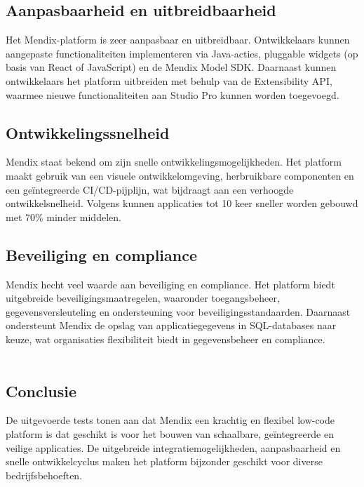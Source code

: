 \subsection{Aanpasbaarheid en uitbreidbaarheid}
Het Mendix-platform is zeer aanpasbaar en uitbreidbaar. Ontwikkelaars kunnen aangepaste functionaliteiten implementeren via Java-acties, pluggable widgets (op basis van React of JavaScript) en de Mendix Model SDK. Daarnaast kunnen ontwikkelaars het platform uitbreiden met behulp van de Extensibility \gls{API}, waarmee nieuwe functionaliteiten aan Studio Pro kunnen worden toegevoegd.

\subsection{Ontwikkelingssnelheid}
Mendix staat bekend om zijn snelle ontwikkelingsmogelijkheden. Het platform maakt gebruik van een visuele ontwikkelomgeving, herbruikbare componenten en een geïntegreerde CI/CD-pijplijn, wat bijdraagt aan een verhoogde ontwikkelsnelheid. Volgens \textcite{MxTechies} kunnen applicaties tot 10 keer sneller worden gebouwd met 70\% minder middelen. 

\subsection{Beveiliging en compliance}
Mendix hecht veel waarde aan beveiliging en compliance. Het platform biedt uitgebreide beveiligingsmaatregelen, waaronder toegangsbeheer, gegevensversleuteling en ondersteuning voor beveiligingsstandaarden. Daarnaast ondersteunt Mendix de opslag van applicatiegegevens in SQL-databases naar keuze, wat organisaties flexibiliteit biedt in gegevensbeheer en compliance. 
\\
\\
\subsection{Conclusie}
De uitgevoerde tests tonen aan dat Mendix een krachtig en flexibel low-code platform is dat geschikt is voor het bouwen van schaalbare, geïntegreerde en veilige applicaties. De uitgebreide integratiemogelijkheden, aanpasbaarheid en snelle ontwikkelcyclus maken het platform bijzonder geschikt voor diverse bedrijfsbehoeften.


